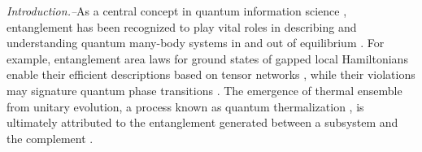 \documentclass[twocolumn,english,prl,aps,superscriptaddress,amsmath,amssymb,floatfix]{revtex4-2}
\begin{document}
\begin{abstract}
\begin{comment}
of the free Fermonic systems is only polynomial in environment size,
rather than exponential. This slower convergence rate can predict
very different local behavior of EE for RFG ensemble.
Later, we turn to some global behavior such as Page curve of the RFG ensemble.
Our work suggests that the Page curve can dynamically emerge with
a class of time independent, translationally symmetric Hamiltonians.
We analytically give a full description of this class of Hamiltonians.
We also pointed out the original method of calculating free-fermionic
dynamical entropy in quasi-particle picture can only give a lower
bound, because this picture ignores correlations among multiple pairs
generated simultaneously. 
\end{comment}
\end{abstract}
\maketitle


\emph{Introduction.--}As
a central concept in quantum information science \citep{nielsen00},
entanglement has been recognized to play vital roles in describing
and understanding quantum many-body systems in and out of equilibrium
\citep{Luigi2008,relation_entropy_Phase,Eisert2015,Abanin2019}. %
For example, entanglement area laws for ground states
of gapped local Hamiltonians enable their efficient descriptions based
on tensor networks \citep{RevModPhys.93.045003}, %
while their violations may signature %
quantum phase transitions \citep{Vidal2003,Calabrese2004}.%
The emergence of thermal ensemble from unitary evolution, a process
known as quantum thermalization \cite{Srednicki1994}, is ultimately attributed to the entanglement
generated between a subsystem and the complement \citep{Nandkishore2015}. %
\end{document}
